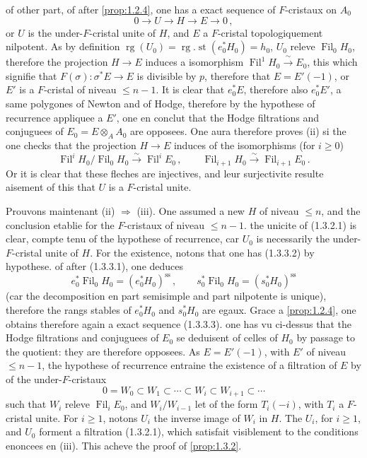 \documentclass[12pt,a4paper]{article}
\theoremstyle{plain}
\theoremstyle{definition}
\theoremstyle{remark}
\DeclareMathOperator{\Fil}{Fil}
\DeclareMathOperator{\rg}{rg}
\DeclareMathOperator{\st}{st}
\begin{document}
of other part, of after \ref{prop:1.2.4}, one has a exact sequence of $F$-cristaux on $A_0$
\begin{equation}\label{eq:1.3.3.3}
0 \longrightarrow U \longrightarrow H \longrightarrow E \longrightarrow 0\,,
\end{equation}
or $U$ is the under-$F$-cristal unite of $H$, and $E$ a $F$-cristal topologiquement nilpotent. As by definition $\rg(U_0) = \rg\nolimits.\st(e_0^*H_0) = h_0$, $U_0$ releve $\Fil_0H_0$, therefore the projection $H \to E$ induces a isomorphism $\Fil^1H_0 \xrightarrow{\;\sim\;} E_0$, this which signifie that $F(\sigma) : \sigma^*E \to E$ is divisible by $p$, therefore that $E = E'(-1)$, or $E'$ is a $F$-cristal of niveau $\leq n-1$. It is clear that $e_0^*E$, therefore also $e_0^*E'$, a same polygones of Newton and of Hodge, therefore by the hypothese of recurrence appliquee a $E'$, one en conclut that the Hodge filtrations and conjuguees of $E_0 = E \otimes_A A_0$ are opposees. One aura therefore proves (ii) si the one checks that the projection $H \to E$ induces of the isomorphisms (for $i \geq 0$)
\[
\Fil^iH_0/\Fil_0H_0 \xrightarrow{\;\sim\;} \Fil^iE_0\,, \qquad \Fil_{i+1}H_0 \xrightarrow{\;\sim\;} \Fil_{i+1}E_0\,.\]
Or it is clear that these fleches are injectives, and leur surjectivite resulte aisement of this that $U$ is a $F$-cristal unite.

Prouvons maintenant (ii) $\Rightarrow$ (iii). One assumed a new $H$ of niveau $\leq n$, and the conclusion etablie for the $F$-cristaux of niveau $\leq n-1$. the unicite of (1.3.2.1) is clear, compte tenu of the hypothese of recurrence, car $U_0$ is necessarily the under-$F$-cristal unite of $H$. For the existence, notons that one has (1.3.3.2) by hypothese. of after (1.3.3.1), one deduces
\[
e_0^*\Fil_0H_0 = (e_0^*H_0)^{\mathrm{ss}}\,, \qquad s_0^*\Fil_0H_0 = (s_0^*H_0)^{\mathrm{ss}}
\]
(car the decomposition en part semisimple and part nilpotente is unique), therefore the rangs stables of $e_0^*H_0$ and $s_0^*H_0$ are egaux. Grace a \ref{prop:1.2.4}, one obtains therefore again a exact sequence (1.3.3.3). one has vu ci-dessus that the Hodge filtrations and conjuguees of $E_0$ se deduisent of celles of $H_0$ by passage to the quotient: they are therefore opposees. As $E = E'(-1)$, with $E'$ of niveau $\leq n-1$, the hypothese of recurrence entraine the existence of a filtration of $E$ by of the under-$F$-cristaux
\[
0 = W_0 \subset W_1 \subset \cdots \subset W_i \subset W_{i+1} \subset \cdots
\]
such that $W_i$ releve $\Fil_iE_0$, and $W_i/W_{i-1}$ let of the form $T_i(-i)$, with $T_i$ a $F$-cristal unite. For $i \geq 1$, notons $U_i$ the inverse image of $W_i$ in $H$. The $U_i$, for $i \geq 1$, and $U_0$ forment a filtration (1.3.2.1), which satisfait visiblement to the conditions enoncees en (iii). This acheve the proof of \ref{prop:1.3.2}.
\end{document}
